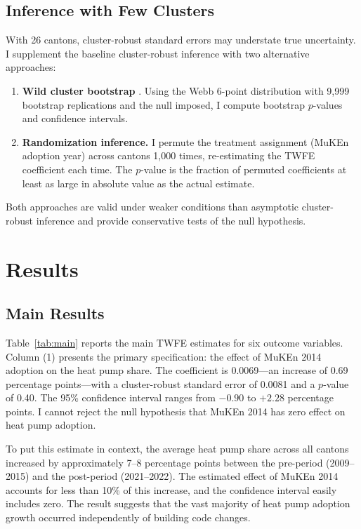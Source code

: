 \documentclass[12pt]{article}
\begin{document}
\subsection{Inference with Few Clusters}

With 26 cantons, cluster-robust standard errors may understate true uncertainty. I supplement the baseline cluster-robust inference with two alternative approaches:

\begin{enumerate}
    \item \textbf{Wild cluster bootstrap} \citep{cameron2008bootstrap}. Using the Webb 6-point distribution with 9,999 bootstrap replications and the null imposed, I compute bootstrap $p$-values and confidence intervals.

    \item \textbf{Randomization inference.} I permute the treatment assignment (MuKEn adoption year) across cantons 1,000 times, re-estimating the TWFE coefficient each time. The $p$-value is the fraction of permuted coefficients at least as large in absolute value as the actual estimate.
\end{enumerate}

Both approaches are valid under weaker conditions than asymptotic cluster-robust inference and provide conservative tests of the null hypothesis.


\section{Results}

\subsection{Main Results}

Table~\ref{tab:main} reports the main TWFE estimates for six outcome variables. Column (1) presents the primary specification: the effect of MuKEn 2014 adoption on the heat pump share. The coefficient is 0.0069---an increase of 0.69 percentage points---with a cluster-robust standard error of 0.0081 and a $p$-value of 0.40. The 95\% confidence interval ranges from $-0.90$ to $+2.28$ percentage points. I cannot reject the null hypothesis that MuKEn 2014 has zero effect on heat pump adoption.

To put this estimate in context, the average heat pump share across all cantons increased by approximately 7--8 percentage points between the pre-period (2009--2015) and the post-period (2021--2022). The estimated effect of MuKEn 2014 accounts for less than 10\% of this increase, and the confidence interval easily includes zero. The result suggests that the vast majority of heat pump adoption growth occurred independently of building code changes.
\end{document}
